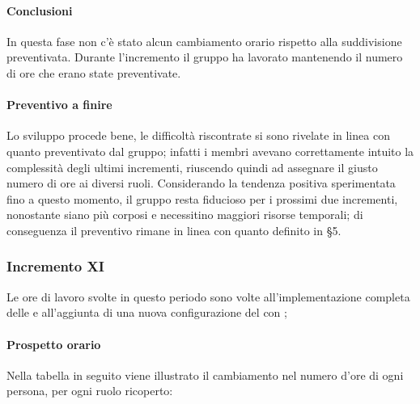 		\paragraph{Conclusioni}
			In questa fase non c'è stato alcun cambiamento orario rispetto alla suddivisione preventivata.
			Durante l'incremento il gruppo ha lavorato mantenendo il numero di ore che erano state preventivate. 
		
		\paragraph{Preventivo a finire}
			Lo sviluppo procede bene, le difficoltà riscontrate si sono rivelate in linea con quanto preventivato dal gruppo; infatti i membri avevano correttamente intuito la complessità degli ultimi incrementi, riuscendo quindi ad assegnare il giusto numero di ore ai diversi ruoli.
			\newline
			Considerando la tendenza positiva sperimentata fino a questo momento, il gruppo resta fiducioso per i prossimi due incrementi, nonostante siano più corposi e necessitino maggiori risorse temporali; di conseguenza il preventivo rimane in linea con quanto definito in \S5.
		\pagebreak
		
		
		\subsubsection{Incremento XI}
		Le ore di lavoro svolte in questo periodo sono volte all'implementazione completa delle  e all'aggiunta di una nuova configurazione del  con ;
		\paragraph{Prospetto orario}
		Nella tabella in seguito viene illustrato il cambiamento nel numero d'ore di ogni persona, per ogni ruolo ricoperto:
		
